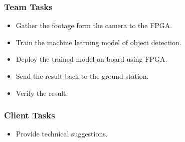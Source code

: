 \subsubsection{Team Tasks}

\begin{itemize}
\item Gather the footage form the camera to the FPGA.
\item Train the machine learning model of object detection.
\item Deploy the trained model on board using FPGA.
\item Send the result back to the ground station.
\item Verify the result.
\end{itemize}

\subsubsection{Client Tasks}

\begin{itemize}
\item Provide technical suggestions.
\end{itemize}